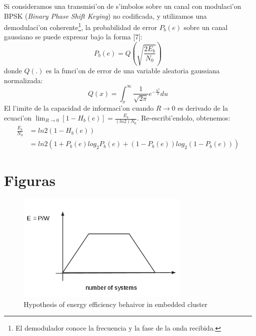 Si consideramos una transmisi'on de s'imbolos sobre un canal con modulaci'on BPSK (\emph{Binary Phase Shift Keying}) no codificada, y utilizamos una demodulaci'on coherente\footnote{El demodulador conoce la frecuencia y la fase de la onda recibida.\label{footnote}}, la probabilidad de error \begin{math}P_b(e)\end{math} sobre un canal gaussiano se puede expresar bajo la forma [7]:
\[P_b(e)=Q\left(\sqrt{\frac{2E_b}{N_0}}\right)\]
donde \begin{math}Q(.)\end{math} es la funci'on de error de una variable aleatoria gaussiana normalizada:
\[Q(x)=\int_x^\infty \frac{1}{\sqrt{2\pi}}e^{-\frac{u^2}{2}}du\]
El l'imite de la capacidad de informaci'on cuando \begin{math}R \to 0\end{math} es derivado de la ecuaci'on \begin{math}\lim_{R \to 0} [1-H_b(e)]=\frac{E_b}{(ln 2) N_0}\end{math}. Re-escribi'endolo, obtenemos:
\[
\begin{aligned}
\frac{E_b}{N_0}&=ln 2(1-H_b(e))\\
&=ln 2(1+P_b(e)log_2P_b(e)+(1-P_b(e))log_2(1-P_b(e)))
\end{aligned}
\]

\section{Figuras}
\noindent
\begin{figure}[H]
\centering
\includegraphics[width=0.75\textwidth]{images/graph_1.png}
\caption{Hypothesis of energy efficiency behaivor in embedded cluster}
\label{fig:4.1}
\end{figure}

